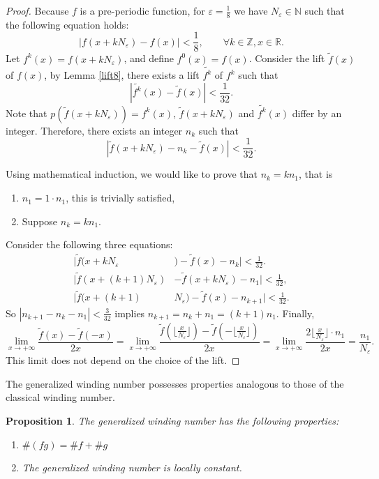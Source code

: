 \documentclass[11pt]{article}
\newtheorem{proposition}[theorem]{Proposition}  %
\theoremstyle{remark}
\begin{document}
\begin{proof}
    Because \(f\) is a pre-periodic function, for \(\varepsilon =\frac{1}{8}\) we have $N_{\varepsilon}\in\mathbb{N}$ such that the following equation holds:
    $$
    |f(x+kN_\varepsilon)-f(x)|<\frac{1}{8},\qquad \forall k\in \mathbb{Z}, x\in \mathbb{R}.
    $$
Let \( f^k(x) = f(x + kN_{\varepsilon}) \), and define \( f^0(x) = f(x) \). Consider the lift \( \tilde{f}(x) \) of \( f(x) \), by Lemma \ref{lift8}, there exists a lift \( \widetilde{f^k} \) of \( f^k \) such that
\[
|\widetilde{f^k}(x) - \tilde{f}(x)| < \frac{1}{32}.
\]
Note that \( p(\tilde{f}(x + kN_{\varepsilon})) = f^k(x) \), \(\tilde{f}(x + kN_{\varepsilon})\) and \(\widetilde{f^k}(x)\) differ by an integer. Therefore, there exists an integer \( n_k \) such that
\[
|\tilde{f}(x + kN_{\varepsilon}) - n_k - \tilde{f}(x)| < \frac{1}{32}.
\]

Using mathematical induction, we would like to prove that \( n_k = kn_1 \), that is
\begin{enumerate}
    \item \( n_1 = 1 \cdot n_1 \), this is trivially satisfied,
    \item Suppose \( n_k = kn_1 \). 
\end{enumerate}
Consider the following three equations:
\begin{align*}
        |\tilde{f}(x + kN_{\varepsilon}&) - \tilde{f}(x) - n_k| < \frac{1}{32}. \\
    |\tilde{f}(x + (k+1)N_\varepsilon) &- \tilde{f}(x + kN_\varepsilon) - n_1| < \frac{1}{32},\\
|\tilde{f}(x + (k+1)&N_\varepsilon) - \tilde{f}(x) - n_{k+1}| < \frac{1}{32}.
 \end{align*}
 So \(|n_{k+1}-n_k-n_1|<\frac{3}{32}\) implies \( n_{k+1} = n_k + n_1 = (k+1)n_1 \). Finally,
\[
\lim_{x \to +\infty} \frac{\tilde{f}(x) - \tilde{f}(-x)}{2x} = \lim_{x \to +\infty} \frac{\tilde{f}\left(\lfloor \frac{x}{N_\varepsilon}\rfloor \right) - \tilde{f}\left(-\lfloor \frac{x}{N_\varepsilon}\rfloor \right)}{2x} = \lim_{x \to +\infty} \frac{2\lfloor \frac{x}{N_\varepsilon}\rfloor \cdot n_1}{2x} = \frac{n_1}{N_\varepsilon}.
\]
This limit does not depend on the choice of the lift.
\end{proof}
The generalized winding number possesses properties analogous to those of the classical winding number. 
\begin{proposition}\label{prop}
    The generalized winding number has the following properties:
\begin{enumerate}
    \item \( \#(fg) = \#f + \#g \)
    \item  The generalized winding number is locally constant.
\end{enumerate}
\end{proposition}
\end{document}
